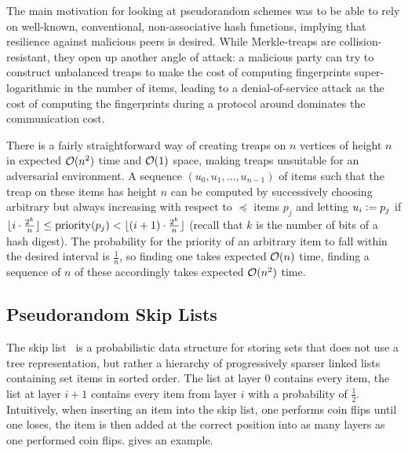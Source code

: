 The main motivation for looking at pseudorandom schemes was to be able to rely on well-known, conventional, non-associative hash functions, implying that resilience against malicious peers is desired. While Merkle-treaps are collision-resistant, they open up another angle of attack: a malicious party can try to construct unbalanced treaps to make the cost of computing fingerprints super-logarithmic in the number of items, leading to a denial-of-service attack as the cost of computing the fingerprints during a protocol around dominates the communication cost.

There is a fairly straightforward way of creating treaps on $n$ vertices of height $n$ in expected $\mathcal{O}(n^2)$ time and $\mathcal{O}(1)$ space, making treaps unsuitable for an adversarial environment. A sequence $(u_0, u_1, \ldots, u_{n - 1})$ of items such that the treap on these items has height $n$ can be computed by successively choosing arbitrary but always increasing with respect to $\preceq$ items $p_j$ and letting $u_i \vcentcolon= p_j$ if $\lfloor i \cdot \frac{2^k}{n}\rfloor \leq \operatorname{priority}(p_j) < \lfloor(i + 1) \cdot \frac{2^k}{n}\rfloor$ (recall that $k$ is the number of bits of a hash digest). The probability for the priority of an arbitrary item to fall within the desired interval is $\frac{1}{n}$, so finding one takes expected $\mathcal{O}(n)$ time, finding a sequence of $n$ of these accordingly takes expected $\mathcal{O}(n^2)$ time.

\subsection{Pseudorandom Skip Lists}

The skip list~\cite{pugh1990skip}\cite{pugh1998skip} is a probabilistic data structure for storing sets that does not use a tree representation, but rather a hierarchy of progressively sparser linked lists containing set items in sorted order. The list at layer $0$ contains every item, the list at layer $i + 1$ contains every item from layer $i$ with a probability of $\frac{1}{2}$. Intuitively, when inserting an item into the skip list, one performs coin flips until one loses, the item is then added at the correct position into as many layers as one performed coin flips.  gives an example.

\newcommand{\skiplistnode}[3]{
\node (n#1#2) at (#1, #2) [skiplistnode] {#3};
}

\newcommand{\skiplisttower}[3]{
\foreach \y in {0,...,#2}
{
    \skiplistnode{#1}{\y}{#3}
}
}


